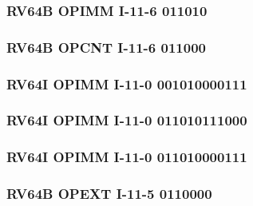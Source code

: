 

\subsubsection[{\small RV64B OPIMM I-11-6 011010}]{RV64B OPIMM I-11-6 011010} \label{sec:format-RV64B-OPIMM-0x1a}



\subsubsection[{\small RV64B OPCNT I-11-6 011000}]{RV64B OPCNT I-11-6 011000} \label{sec:format-RV64B-OPCNT-0x18}



\subsubsection[{\small RV64I OPIMM I-11-0 001010000111}]{RV64I OPIMM I-11-0 001010000111} \label{sec:format-RV64B-OPIMM-0x287}



\subsubsection[{\small RV64I OPIMM I-11-0 011010111000}]{RV64I OPIMM I-11-0 011010111000} \label{sec:format-RV64B-OPIMM-0x6b8}



\subsubsection[{\small RV64I OPIMM I-11-0 011010000111}]{RV64I OPIMM I-11-0 011010000111} \label{sec:format-RV64B-OPIMM-0x687}



\subsubsection[{\small RV64B OPEXT I-11-5 0110000}]{RV64B OPEXT I-11-5 0110000} \label{sec:format-RV64B-OPEXT-0x30}



